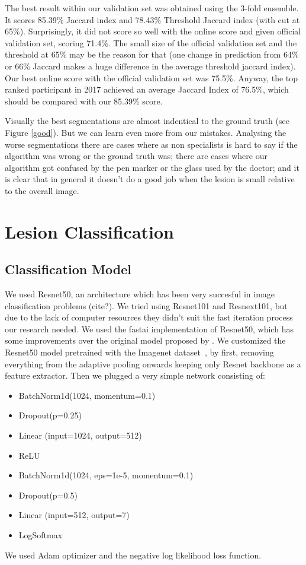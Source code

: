 \documentclass[conference]{IEEEtran}
\begin{document}
The best result within our validation set was obtained using the 3-fold ensemble.  It scores 85.39\% Jaccard index and 78.43\% Threshold Jaccard index (with cut at 65\%). Surprisingly, it did not score so well with the online score and given official validation set, scoring 71.4\%.  The small size of the official validation set and the threshold at 65\% may be the reason for that (one change in prediction from 64\% or 66\% Jaccard makes a huge difference in the average threshold jaccard index). Our best online score with the official validation set was 75.5\%. Anyway, the top ranked participant in 2017 achieved an average Jaccard Index of 76.5\%, which should be compared with our 85.39\% score.

Visually the best segmentations are almost indentical to the ground truth (see Figure \ref{good}). But we can learn even more from our mistakes. Analysing the worse segmentations there are cases where as non specialists is hard to say if the algorithm was wrong or the ground truth was; there are cases where our algorithm got confused by the pen marker or the glass used by the doctor; and it is clear that in general it doesn't do a good job when the lesion is small relative to the overall image. 

\section{Lesion Classification}
\label{classification}

\subsection{Classification Model}
We used Resnet50, an architecture which has been very succesful in image classification problems (cite?). We tried using Resnet101 and Resnext101, but due to the lack of computer resources they didn't suit the fast iteration process our research needed. We used the fastai implementation of Resnet50, which has some improvements over the original model proposed by \cite{resnet}. We customized the Resnet50 model pretrained with the Imagenet dataset~\cite{imagenet}, by first, removing everything from the adaptive pooling onwards keeping only Resnet backbone as a feature extractor. Then we plugged a very simple network consisting of:
\begin{itemize}
\item BatchNorm1d(1024, momentum=0.1)
\item Dropout(p=0.25)
\item Linear (input=1024, output=512)
\item ReLU 
\item BatchNorm1d(1024, eps=1e-5, momentum=0.1)
\item Dropout(p=0.5)
\item Linear (input=512, output=7)
\item LogSoftmax
\end{itemize}
We used Adam optimizer and the negative log likelihood loss function.
\end{document}
